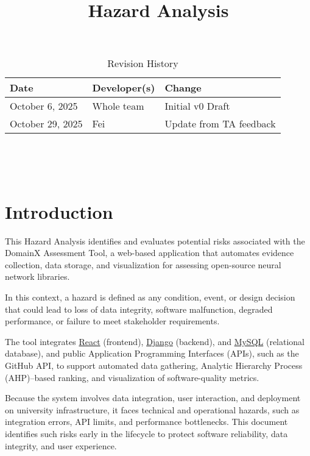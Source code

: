 \documentclass{article}
\title{Hazard Analysis\\\progname}
\author{\authname}
\date{}
\begin{document}
\maketitle
\thispagestyle{empty}

\begin{table}[hp]
\caption{Revision History} \label{TblRevisionHistory}
\begin{tabularx}{\textwidth}{llX}
\toprule
\textbf{Date} & \textbf{Developer(s)} & \textbf{Change}\\
\midrule
October 6, 2025  & Whole team & Initial v0 Draft\\
October 29, 2025 & Fei & Update from TA feedback\\
\bottomrule
\end{tabularx}
\end{table}

~\newpage
\thispagestyle{empty}

\tableofcontents

~\newpage


\section{Introduction}


This Hazard Analysis identifies and evaluates potential risks associated with
the DomainX Assessment Tool, a web-based application that
automates evidence collection, data storage, and visualization for assessing
open-source neural network libraries. 

In this context, a hazard is defined as any condition, event, or design
decision that could lead to loss of data integrity, software malfunction,
degraded performance, or failure to meet stakeholder requirements.

The tool integrates \href{https://react.dev/}{React} (frontend), \href{https://www.djangoproject.com/}{Django} (backend), and \href{https://www.mysql.com/}{MySQL}
(relational database), and public Application Programming Interfaces (APIs), such as the
GitHub API, to support automated data gathering, Analytic Hierarchy Process
(AHP)--based ranking, and visualization of software-quality metrics.

Because the system involves data integration, user interaction, and deployment
on university infrastructure, it faces technical and operational hazards, such as integration errors, API limits, and performance bottlenecks. This
document identifies such risks early in the lifecycle to protect software
reliability, data integrity, and user experience.
\end{document}
